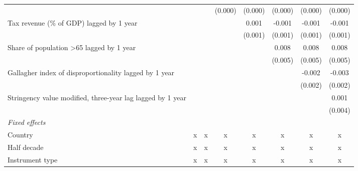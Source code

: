 \begin{tabular}{lccccccc}
                                                                                        &         &         & (0.000) & (0.000) & (0.000)       & (0.000)       & (0.000)\\   
   Tax revenue (\% of GDP) lagged by 1 year                                             &         &         &         & 0.001   & -0.001        & -0.001        & -0.001\\   
                                                                                        &         &         &         & (0.001) & (0.001)       & (0.001)       & (0.001)\\   
   Share of population >65 lagged by 1 year                                             &         &         &         &         & 0.008         & 0.008         & 0.008\\   
                                                                                        &         &         &         &         & (0.005)       & (0.005)       & (0.005)\\   
   Gallagher index of disproportionality lagged by 1 year                               &         &         &         &         &               & -0.002        & -0.003\\   
                                                                                        &         &         &         &         &               & (0.002)       & (0.002)\\   
   Stringency value modified, three-year lag lagged by 1 year                           &         &         &         &         &               &               & 0.001\\   
                                                                                        &         &         &         &         &               &               & (0.004)\\   
   \emph{Fixed effects}\\
   Country                                                                              & x       & x       & x       & x       & x             & x             & x\\  
   Half decade                                                                          & x       & x       & x       & x       & x             & x             & x\\  
   Instrument type                                                                      & x       & x       & x       & x       & x             & x             & x\\  

\end{tabular}
